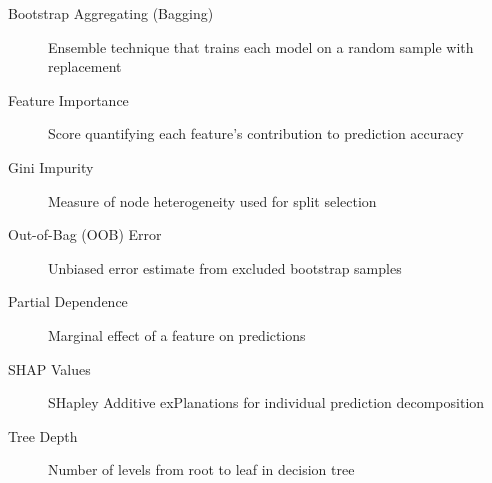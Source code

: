 \begin{description}
    \item[Bootstrap Aggregating (Bagging)] Ensemble technique that trains each model on a random sample with replacement
    \item[Feature Importance] Score quantifying each feature's contribution to prediction accuracy
    \item[Gini Impurity] Measure of node heterogeneity used for split selection
    \item[Out-of-Bag (OOB) Error] Unbiased error estimate from excluded bootstrap samples
    \item[Partial Dependence] Marginal effect of a feature on predictions
    \item[SHAP Values] SHapley Additive exPlanations for individual prediction decomposition
    \item[Tree Depth] Number of levels from root to leaf in decision tree
\end{description}
